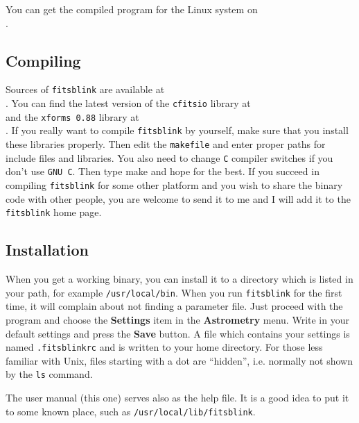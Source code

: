 \documentclass[11pt]{article}
\begin{document}
You can get the compiled program for the Linux system on\\
.

\subsection{Compiling}

Sources of \verb=fitsblink= are available at\\
.
You can find the latest version of the \verb=cfitsio= library at\\
and the \verb=xforms 0.88= library at\\
.
If you really want to compile \verb=fitsblink= by yourself, make sure
that you install these libraries properly.  Then edit the
\verb=makefile= and enter proper paths for include files and
libraries. You also need to change \verb=C= compiler switches if you
don't use \verb=GNU C=.  Then type make and hope for the best.  If you
succeed in compiling \verb=fitsblink= for some other platform and you
wish to share the binary code with other people, you are welcome to
send it to me and I will add it to the \verb=fitsblink= home page.

\subsection{Installation}

When you get a working binary, you can install it to a directory which
is listed in your path, for example \verb=/usr/local/bin=.  When you
run \verb=fitsblink= for the first time, it will complain about not
finding a parameter file.  Just proceed with the program and choose
the \textbf{Settings} item in the \textbf{Astrometry} menu.
Write in your default settings and press the \textbf{Save} button. A
file which contains your settings is named \verb=.fitsblinkrc= and is
written to your home directory.  For those less familiar with Unix,
files starting with a dot are ``hidden'', i.e. normally not shown by
the \verb=ls= command.  

The user manual (this one) serves also as the help file. It is a good
idea to put it to some known place, such as
\verb=/usr/local/lib/fitsblink=.
\end{document}
